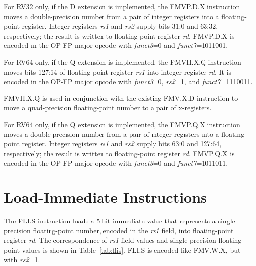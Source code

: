 For RV32 only, if the D extension is implemented,
the FMVP.D.X instruction moves a double-precision number from a pair of integer
registers into a floating-point register.  Integer registers {\em rs1} and
{\em rs2} supply bits 31:0 and 63:32, respectively; the result is written to
floating-point register {\em rd}.
FMVP.D.X is encoded in the OP-FP major opcode with {\em funct3}=0
and {\em funct7}=1011001.

For RV64 only, if the Q extension is implemented,
the FMVH.X.Q instruction moves bits 127:64 of floating-point register {\em rs1}
into integer register {\em rd}.
It is encoded in the OP-FP major opcode with {\em funct3}=0, {\em rs2}=1,
and {\em funct7}=1110011.

\begin{commentary}
FMVH.X.Q is used in conjunction with the existing FMV.X.D instruction to move
a quad-precision floating-point number to a pair of x-registers.
\end{commentary}

For RV64 only, if the Q extension is implemented,
the FMVP.Q.X instruction moves a double-precision number from a pair of integer
registers into a floating-point register.  Integer registers {\em rs1} and
{\em rs2} supply bits 63:0 and 127:64, respectively; the result is written to
floating-point register {\em rd}.
FMVP.Q.X is encoded in the OP-FP major opcode with {\em funct3}=0
and {\em funct7}=1011011.


\section{Load-Immediate Instructions}

The FLI.S instruction loads a 5-bit immediate value that represents
a single-precision floating-point number, encoded in the {\em rs1} field, into
floating-point register {\em rd}.
The correspondence of {\em rs1} field values and single-precision
floating-point values is shown in Table~\ref{tab:flis}.
FLI.S is encoded like FMV.W.X, but with {\em rs2}=1.

